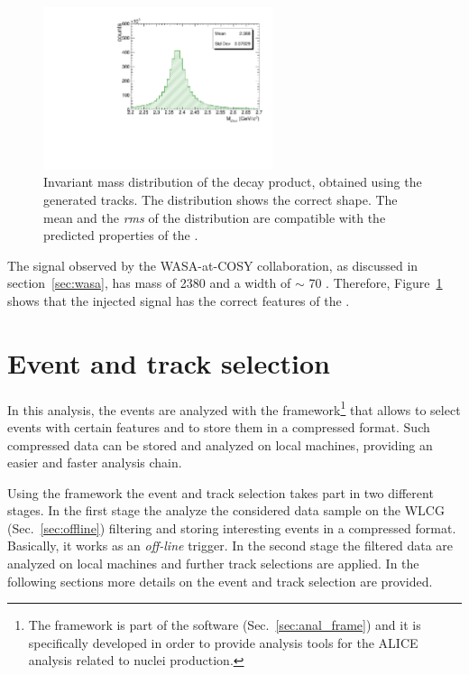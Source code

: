 \begin{figure}
    \centering
    \includegraphics[width=0.6\textwidth]{gfx/valid}
	\caption{Invariant mass distribution of the \dst decay product, obtained using the generated tracks. The distribution shows the correct shape. The mean and the \textit{rms} of the distribution are compatible with the predicted properties of the \dst.}
	\label{fig:valid}
\end{figure}

The signal observed by the WASA-at-COSY collaboration, as discussed in section~\ref{sec:wasa}, has
mass of 2380 \mevcs and a width of $\sim$ 70 \mevcs. Therefore, Figure~\ref{fig:valid} shows that the
injected signal has the correct features of the \dst.

%
%
\section{Event and track selection} \label{sec:4.2}

In this analysis, the events are analyzed with the  framework\footnote{The  
framework is part of the  software (Sec.~\ref{sec:anal_frame}) and it is 
specifically developed in order to provide analysis tools for the ALICE analysis related to nuclei
production.} that allows to select events with certain features and to store them in a compressed
format.
Such compressed data can be stored and analyzed on local machines, providing an easier and faster 
analysis chain.

Using the  framework the event and track selection takes part in two different stages.
In the first stage the  analyze the considered data sample on the WLCG (Sec.~\ref{sec:offline}) filtering and storing interesting events in a compressed format. 
Basically, it works as an \textit{off-line} trigger.
In the second stage the filtered data are analyzed on local machines and further track
selections are applied.
In the following sections more details on the event and track selection are provided.


